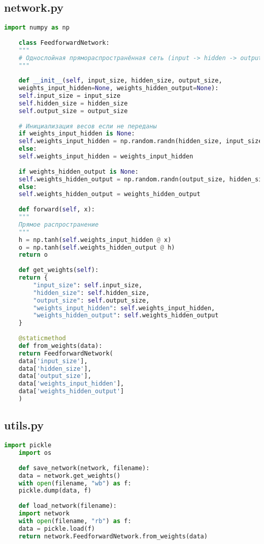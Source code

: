 \documentclass[a4paper,12pt]{article}
\begin{document}
\subsection*{network.py}
\begin{lstlisting}[language=Python, caption={network.py}]
	import numpy as np
	
	class FeedforwardNetwork:
	"""
	# Однослойная прямораспространённая сеть (input -> hidden -> output)
	"""
	
	def __init__(self, input_size, hidden_size, output_size,
	weights_input_hidden=None, weights_hidden_output=None):
	self.input_size = input_size
	self.hidden_size = hidden_size
	self.output_size = output_size
	
	# Инициализация весов если не переданы
	if weights_input_hidden is None:
	self.weights_input_hidden = np.random.randn(hidden_size, input_size) * 0.1
	else:
	self.weights_input_hidden = weights_input_hidden
	
	if weights_hidden_output is None:
	self.weights_hidden_output = np.random.randn(output_size, hidden_size) * 0.1
	else:
	self.weights_hidden_output = weights_hidden_output
	
	def forward(self, x):
	"""
	Прямое распространение
	"""
	h = np.tanh(self.weights_input_hidden @ x)
	o = np.tanh(self.weights_hidden_output @ h)
	return o
	
	def get_weights(self):
	return {
		"input_size": self.input_size,
		"hidden_size": self.hidden_size,
		"output_size": self.output_size,
		"weights_input_hidden": self.weights_input_hidden,
		"weights_hidden_output": self.weights_hidden_output
	}
	
	@staticmethod
	def from_weights(data):
	return FeedforwardNetwork(
	data['input_size'],
	data['hidden_size'],
	data['output_size'],
	data['weights_input_hidden'],
	data['weights_hidden_output']
	)
\end{lstlisting}

\subsection*{utils.py}
\begin{lstlisting}[language=Python, caption={utils.py}]
	import pickle
	import os
	
	def save_network(network, filename):
	data = network.get_weights()
	with open(filename, "wb") as f:
	pickle.dump(data, f)
	
	def load_network(filename):
	import network
	with open(filename, "rb") as f:
	data = pickle.load(f)
	return network.FeedforwardNetwork.from_weights(data)
\end{lstlisting}
\end{document}
